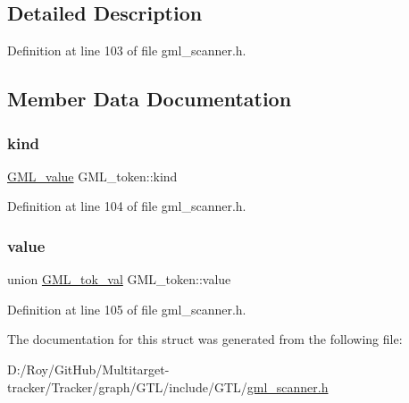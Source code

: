 \subsection{Detailed Description}


Definition at line 103 of file gml\+\_\+scanner.\+h.



\subsection{Member Data Documentation}
\mbox{\label{struct_g_m_l__token_a64e55496b543f370d8188b35095e0585}} 
\subsubsection{\texorpdfstring{kind}{kind}}
{\footnotesize\ttfamily \mbox{\hyperlink{gml__scanner_8h_a2dc4839311e05f9a17adefcd0012b77f}{G\+M\+L\+\_\+value}} G\+M\+L\+\_\+token\+::kind}



Definition at line 104 of file gml\+\_\+scanner.\+h.

\mbox{\label{struct_g_m_l__token_a50b20988e3fe419332313e8d9e02c775}} 
\subsubsection{\texorpdfstring{value}{value}}
{\footnotesize\ttfamily union \mbox{\hyperlink{union_g_m_l__tok__val}{G\+M\+L\+\_\+tok\+\_\+val}} G\+M\+L\+\_\+token\+::value}



Definition at line 105 of file gml\+\_\+scanner.\+h.



The documentation for this struct was generated from the following file\+:\begin{DoxyCompactItemize}
\item 
D\+:/\+Roy/\+Git\+Hub/\+Multitarget-\/tracker/\+Tracker/graph/\+G\+T\+L/include/\+G\+T\+L/\mbox{\hyperlink{gml__scanner_8h}{gml\+\_\+scanner.\+h}}\end{DoxyCompactItemize}
